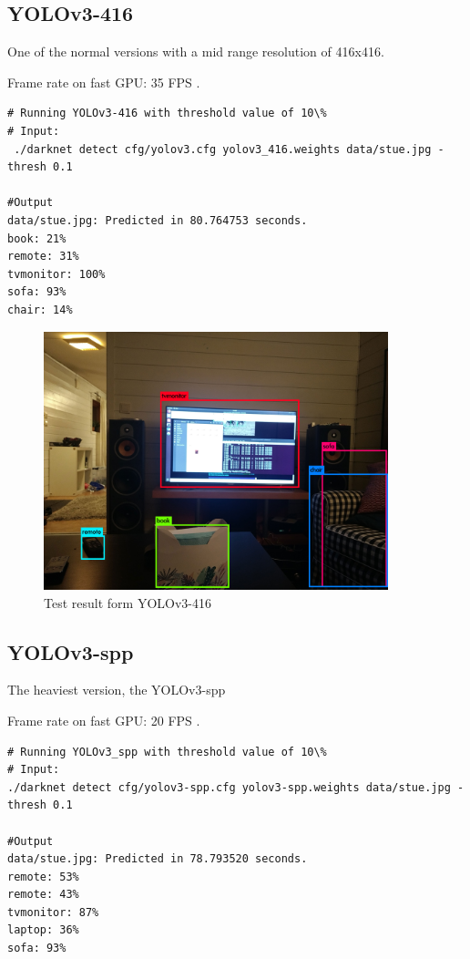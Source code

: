 \subsection*{YOLOv3-416}
One of the normal versions with a mid range resolution of 416x416.

Frame rate on fast GPU: 35 FPS \cite{yolo_res}.
\begin{lstlisting}[frame=single]
# Running YOLOv3-416 with threshold value of 10\% 
# Input:
 ./darknet detect cfg/yolov3.cfg yolov3_416.weights data/stue.jpg -thresh 0.1
 
#Output
data/stue.jpg: Predicted in 80.764753 seconds.
book: 21%
remote: 31%
tvmonitor: 100%
sofa: 93%
chair: 14%
\end{lstlisting}

\begin{figure}[hb]
    \centering
        \includegraphics[width=10cm]{experiment_files/YOLOv3_416.jpg}
    \caption{Test result form YOLOv3-416}
    \label{fig:YOLOv3_416}
\end{figure}
\newpage
\subsection*{YOLOv3-spp}
The heaviest version, the YOLOv3-spp

Frame rate on fast GPU: 20 FPS \cite{yolo_res}.
\begin{lstlisting}[frame=single]
# Running YOLOv3_spp with threshold value of 10\% 
# Input:
./darknet detect cfg/yolov3-spp.cfg yolov3-spp.weights data/stue.jpg -thresh 0.1

#Output
data/stue.jpg: Predicted in 78.793520 seconds.
remote: 53%
remote: 43%
tvmonitor: 87%
laptop: 36%
sofa: 93%
\end{lstlisting}

